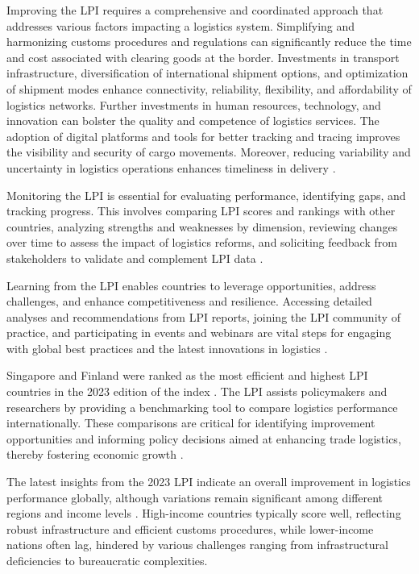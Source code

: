 \documentclass[sigconf]{acmart}
\begin{document}
Improving the LPI requires a comprehensive and coordinated approach that addresses various factors impacting a logistics system. Simplifying and harmonizing customs procedures and regulations can significantly reduce the time and cost associated with clearing goods at the border. Investments in transport infrastructure, diversification of international shipment options, and optimization of shipment modes enhance connectivity, reliability, flexibility, and affordability of logistics networks. Further investments in human resources, technology, and innovation can bolster the quality and competence of logistics services. The adoption of digital platforms and tools for better tracking and tracing improves the visibility and security of cargo movements. Moreover, reducing variability and uncertainty in logistics operations enhances timeliness in delivery \cite{WBreport2018}.

Monitoring the LPI is essential for evaluating performance, identifying gaps, and tracking progress. This involves comparing LPI scores and rankings with other countries, analyzing strengths and weaknesses by dimension, reviewing changes over time to assess the impact of logistics reforms, and soliciting feedback from stakeholders to validate and complement LPI data \cite{WBreport2018}.

Learning from the LPI enables countries to leverage opportunities, address challenges, and enhance competitiveness and resilience. Accessing detailed analyses and recommendations from LPI reports, joining the LPI community of practice, and participating in events and webinars are vital steps for engaging with global best practices and the latest innovations in logistics \cite{worldbank4}.

Singapore and Finland were ranked as the most efficient and highest LPI countries in the 2023 edition of the index \cite{worldbank4}. The LPI assists policymakers and researchers by providing a benchmarking tool to compare logistics performance internationally. These comparisons are critical for identifying improvement opportunities and informing policy decisions aimed at enhancing trade logistics, thereby fostering economic growth \cite{arvis2023}.

The latest insights from the 2023 LPI indicate an overall improvement in logistics performance globally, although variations remain significant among different regions and income levels \cite{arvis2023}. High-income countries typically score well, reflecting robust infrastructure and efficient customs procedures, while lower-income nations often lag, hindered by various challenges ranging from infrastructural deficiencies to bureaucratic complexities.
\end{document}
